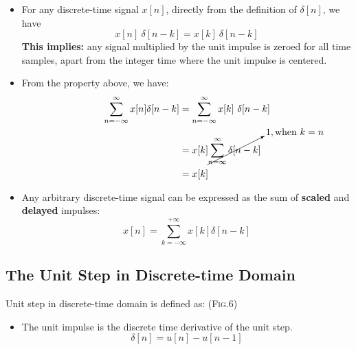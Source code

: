 \begin{itemize}
 \item For any discrete-time signal $x[n]$, directly from the definition of $\delta[n]$, we have
   \[ x[n] \ \delta[n-k] = x[k] \ \delta[n-k] \]
 \quad \textbf{This implies:} any signal multiplied by the unit impulse is zeroed for all time samples, apart from the integer
 time where the unit impulse is centered.
 \item From the property above, we have:
 \begin{align*} \begin{split}
  \sum_{n=-\infty}^{\infty}x[n]\delta[n-k]  &=  \sum_{n=-\infty}^{\infty}x[k] \ \delta[n-k] \\
  &= x[k] \cancelto{1, \text{when} \ k=n}{\sum_{n=\infty}^{\infty}\delta[n-k]} \\
  &= x[k]
 \end{split} \end{align*}
 \item Any arbitrary discrete-time signal can be expressed as the sum of \textbf{scaled} and \textbf{delayed} impulses:
 \[ x[n] = \sum_{k=-\infty}^{+\infty}x[k]\delta[n-k] \] 
\end{itemize}

\subsection{The Unit Step in Discrete-time Domain}
Unit step in discrete-time domain is defined as: (\textsc{Fig.6})\\
\begin{itemize}
 \item The unit impulse is the discrete time derivative of the unit step.
 \[ \delta[n] = u[n] - u[n-1] \]
\end{itemize}


